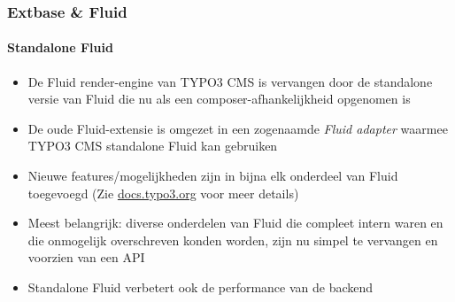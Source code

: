 \begin{frame}[fragile]
	\frametitle{Extbase \& Fluid}
	\framesubtitle{Standalone Fluid}

	\lstset{basicstyle=\tiny\ttfamily}

	\begin{itemize}

		\item De Fluid render-engine van TYPO3 CMS is vervangen door de standalone
			versie van Fluid die nu als een composer-afhankelijkheid opgenomen is

		\item De oude Fluid-extensie is omgezet in een zogenaamde \textit{Fluid adapter}
			waarmee TYPO3 CMS standalone Fluid kan gebruiken

		\item Nieuwe features/mogelijkheden zijn in bijna elk onderdeel van Fluid toegevoegd
			\small
				(Zie \href{https://docs.typo3.org/typo3cms/extensions/core/8-dev/Changelog/8.0/Feature-69863-UseNewStandaloneFluidAsComposerDependency.html}{docs.typo3.org}
				voor meer details)
			\normalsize

		\item Meest belangrijk: diverse onderdelen van Fluid die compleet intern waren en die
			onmogelijk overschreven konden worden, zijn nu simpel te vervangen en
			voorzien van een API

		\item Standalone Fluid verbetert ook de performance van de backend

	\end{itemize}

\end{frame}


